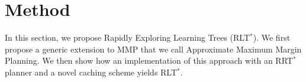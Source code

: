\documentclass[letterpaper, 10 pt, conference]{ieeeconf}
\begin{document}
\section{Method}
	In this section, we propose Rapidly Exploring Learning Trees (RLT$^*$).  We first propose a generic extension to MMP that we call Approximate Maximum Margin Planning.  We then show how an implementation of this approach with an RRT$^*$ planner and a novel caching scheme yields RLT$^*$.


\end{document}
